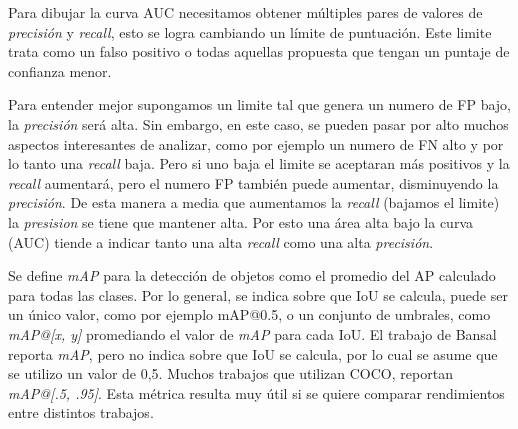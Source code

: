 Para dibujar la curva AUC necesitamos obtener múltiples pares de valores de \textit{precisión} y \textit{recall}, esto se logra cambiando un límite de puntuación. Este limite trata como un falso positivo o todas aquellas propuesta que tengan un puntaje de confianza menor.

Para entender mejor supongamos un limite tal que genera un numero de FP bajo, la \textit{precisión} será alta. Sin embargo, en este caso, se pueden pasar por alto muchos aspectos interesantes de analizar, como por ejemplo un numero de FN alto y por lo tanto una \textit{recall} baja. Pero si uno baja el limite se aceptaran más positivos y la \textit{recall} aumentará, pero el numero FP también puede aumentar, disminuyendo la \textit{precisión}. De esta manera a media que aumentamos la \textit{recall} (bajamos el limite) la \textit{presision} se tiene que mantener alta. Por esto una área alta bajo la curva (AUC) tiende a indicar tanto una alta \textit{recall} como una alta \textit{precisión}.


Se define \textit{mAP} para la detección de objetos como el promedio del AP calculado para todas las clases. Por lo general, se indica sobre que IoU se calcula, puede ser un único valor, como por ejemplo mAP@0.5, o un conjunto de umbrales, como \textit{mAP@[x, y]} promediando el valor de \textit{mAP} para cada IoU. El trabajo de Bansal \etal~\cite{bansal2018zero} reporta \textit{mAP}, pero no indica sobre que IoU se calcula, por lo cual se asume que se utilizo un valor de 0,5. Muchos trabajos que utilizan COCO, reportan \textit{mAP@[.5, .95]}. Esta métrica resulta muy útil si se quiere comparar rendimientos entre distintos trabajos.

